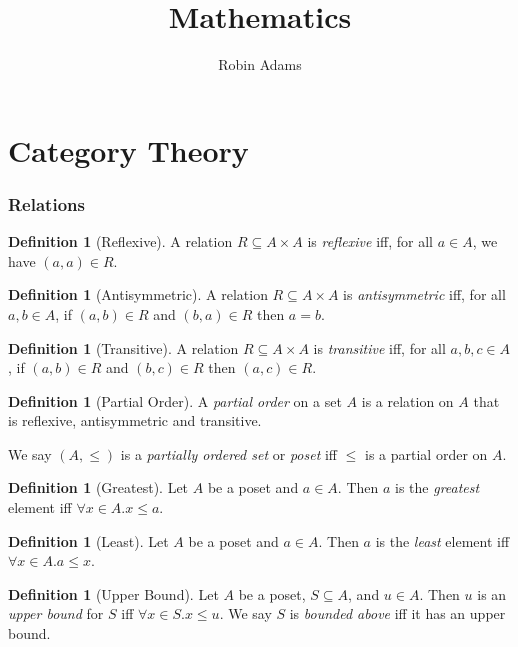 \documentclass{book}
\title{Mathematics}
\author{Robin Adams}
\theoremstyle{definition}
\newtheorem{df}[ax]{Definition}
\begin{document}
\maketitle
\tableofcontents



\part{Category Theory}

\section{Relations}

\begin{df}[Reflexive]
A relation $R \subseteq A \times A$ is \emph{reflexive} iff, for all $a \in A$, we have $(a,a) \in R$.
\end{df}

\begin{df}[Antisymmetric]
A relation $R \subseteq A \times A$ is \emph{antisymmetric} iff, for all $a,b \in A$, if $(a,b) \in R$ and $(b,a) \in R$ then $a = b$.
\end{df}

\begin{df}[Transitive]
A relation $R \subseteq A \times A$ is \emph{transitive} iff, for all $a,b,c \in A$, if $(a,b) \in R$ and $(b,c) \in R$ then $(a,c) \in R$.
\end{df}

\begin{df}[Partial Order]
A \emph{partial order} on a set $A$ is a relation on $A$ that is reflexive, antisymmetric and transitive.

We say $(A, \leq)$ is a \emph{partially ordered set} or \emph{poset} iff $\leq$ is a partial order on $A$.
\end{df}

\begin{df}[Greatest]
Let $A$ be a poset and $a \in A$. Then $a$ is the \emph{greatest} element iff $\forall x \in A. x \leq a$.
\end{df}

\begin{df}[Least]
Let $A$ be a poset and $a \in A$. Then $a$ is the \emph{least} element iff $\forall x \in A. a \leq x$.
\end{df}

\begin{df}[Upper Bound]
Let $A$ be a poset, $S \subseteq A$, and $u \in A$. Then $u$ is an \emph{upper bound} for $S$ iff $\forall x \in S. x \leq u$. We say $S$ is \emph{bounded above} iff it has an upper bound.
\end{df}
\end{document}
